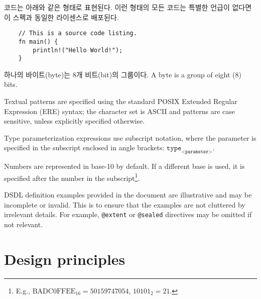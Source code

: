 코드는 아래와 같은 형태로 표현된다.
이런 형태의 모든 코드는 특별한 언급이 없다면 이 스펙과 동일한 라이센스로 배포된다.

\begin{verbatim}
    // This is a source code listing.
    fn main() {
        println!("Hello World!");
    }
\end{verbatim}

하나의 바이트(byte)는 8개 비트(bit)의 그룹이다.
A byte is a group of eight (8) bits.

Textual patterns are specified using the standard
POSIX Extended Regular Expression (ERE) syntax;
the character set is ASCII and patterns are case sensitive, unless explicitly specified otherwise.

Type parameterization expressions use subscript notation,
where the parameter is specified in the subscript enclosed in angle brackets:
$\texttt{type}_\texttt{<parameter>}$.

Numbers are represented in base-10 by default.
If a different base is used, it is specified after the number in the subscript\footnote{%
    E.g., $\text{BADC0FFEE}_{16} = 50159747054$, $10101_2 = 21$.
}.

DSDL definition examples provided in the document are illustrative and may be incomplete or invalid.
This is to ensure that the examples are not cluttered by irrelevant details.
For example, \verb|@extent| or \verb|@sealed| directives may be omitted if not relevant.

\section{Design principles}


